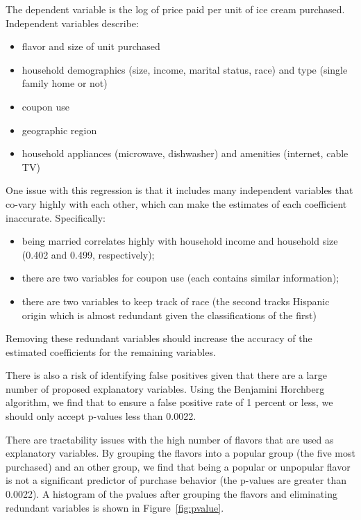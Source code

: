 \documentclass[11pt, fleqn]{article}
\begin{document}
The dependent variable is the log of price paid per unit of ice cream purchased. Independent variables describe:
\begin{itemize}
  \item flavor and size of unit purchased
  \item household demographics (size, income, marital status, race) and type (single family home or not)
  \item coupon use
  \item geographic region
  \item household appliances (microwave, dishwasher) and amenities (internet, cable TV)
\end{itemize}

One issue with this regression is that it includes many independent variables that co-vary highly with each other, which can make the estimates of each coefficient inaccurate. Specifically:
\begin{itemize}
  \item being married correlates highly with household income and household size (0.402 and 0.499, respectively);
  \item there are two variables for coupon use (each contains similar information);
  \item there are two variables to keep track of race (the second tracks Hispanic origin which is almost redundant given the classifications of the first)
\end{itemize}
Removing these redundant variables should increase the accuracy of the estimated coefficients for the remaining variables. 

There is also a risk of identifying false positives given that there are a large number of proposed explanatory variables. Using the Benjamini Horchberg algorithm, we find that to ensure a false positive rate of 1 percent or less, we should only accept p-values less than 0.0022.

There are tractability issues with the high number of flavors that are used as explanatory variables. By grouping the flavors into a popular group (the five most purchased) and an other group, we find that being a popular or unpopular flavor is not a significant predictor of purchase behavior (the p-values are greater than 0.0022).  A histogram of the pvalues after grouping the flavors and eliminating redundant variables is shown in Figure~\vref{fig:pvalue}.
\end{document}
